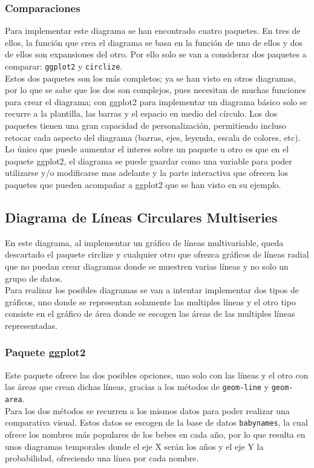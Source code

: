 \documentclass{article}\usepackage[]{graphicx}\usepackage[]{color}
\begin{document}
\subsubsection{Comparaciones}
Para implementar este diagrama se han encontrado cuatro paquetes. En tres de ellos, la funci\'on que crea el diagrama se basa en la funci\'on de uno de ellos y dos de ellos son expansiones del otro. Por ello solo se van a considerar dos paquetes a comparar: \texttt{ggplot2} y \texttt{circlize}.~\\
Estos dos paquetes son los m\'as completos; ya se han visto en otros diagramas, por lo que se sabe que los dos son complejos, pues necesitan de muchas funciones para crear el diagrama; con ggplot2 para implementar un diagrama b\'asico solo se recurre a la plantilla, las barras y el espacio en medio del c\'irculo. Los dos paquetes tienen una gran capacidad de personalizaci\'on, permitiendo incluso retocar cada aspecto del diagrama (barras, ejes, leyenda, escala de colores, etc). Lo \'unico que puede aumentar el interes sobre un paquete u otro es que en el paquete ggplot2, el diagrama se puede guardar como una variable para poder utilizarse y/o modificarse mas adelante y la parte interactiva que ofrecen los paquetes que pueden acompa\~nar a ggplot2 que se han visto en su ejemplo.
\clearpage
\subsection{Diagrama de L\'ineas Circulares Multiseries}\label{ssec:lineascircularmultiseries}
En este diagrama, al implementar un gr\'afico de l\'ineas multivariable, queda descartado el paquete circlize y cualquier otro que ofrezca gr\'aficos de l\'ineas radial que no puedan crear diagramas donde se muestren varias l\'ineas y no solo un grupo de datos.~\\
Para realizar los posibles diagramas se van a intentar implementar dos tipos de gr\'aficos, uno donde se representan solamente las multiples l\'ineas y el otro tipo consiste en el gr\'afico de \'area donde se escogen las \'areas de las multiples l\'ineas representadas.
\subsubsection{Paquete ggplot2}
Este paquete\cite{docu_ggplot2} ofrece las dos posibles opciones, uno solo con las l\'ineas y el otro con las \'areas que crean dichas l\'ineas, gracias a los m\'etodos de \texttt{geom-line} y \texttt{geom-area}.~\\
Para los dos m\'etodos se recurren a los mismos datos para poder realizar una comparativa visual. Estos datos se escogen de la base de datos \texttt{babynames}, la cual ofrece los nombres m\'as populares de los bebes en cada a\~no, por lo que resulta en unos diagramas temporales donde el eje X ser\'an los a\~nos y el eje Y la probabilidad, ofreciendo una l\'inea por cada nombre.
\end{document}

